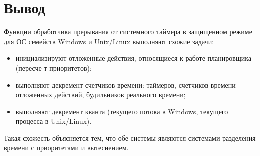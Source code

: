 \chapter*{Вывод}
Функции обработчика прерывания от системного таймера в защищенном режиме для ОС семейств Windows и Unix/Linux выполняют схожие задачи:
\begin{itemize}
	\item инициализируют отложенные действия, относящиеся к работе планировщика (пересче т приоритетов);
	\item выполняют декремент счетчиков времени: таймеров, счетчиков времени отложенных действий, будильников реального времени;
	\item выполняют декремент кванта (текущего потока в Windows, текущего процесса в Unix/Linux).
\end{itemize}

Такая схожесть объясняется тем, что обе системы являются системами разделения времени с приоритетами и вытеснением.